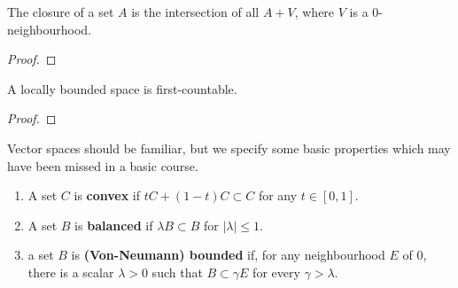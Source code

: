 \begin{corollary}
    The closure of a set $A$ is the intersection of all $A + V$, where $V$ is a 0-neighbourhood.
\end{corollary}
\begin{proof}

\end{proof}

\begin{prop}
    A locally bounded space is first-countable.
\end{prop}
\begin{proof}
    
\end{proof}

\begin{definition}
Vector spaces should be familiar, but we specify some basic properties which may have been missed in a basic course.
\begin{enumerate}
    \item A set $C$ is {\bf convex} if $tC + (1 - t)C \subset C$ for any $t \in [0,1]$.
    \item A set $B$ is {\bf balanced} if $\lambda B \subset B$ for $| \lambda | \leq 1$.
    \item a set $B$ is {\bf (Von-Neumann) bounded} if, for any neighbourhood $E$ of 0, there is a scalar $\lambda > 0$ such that $B \subset \gamma E$ for every $\gamma > \lambda$.
\end{enumerate}
\end{definition}

